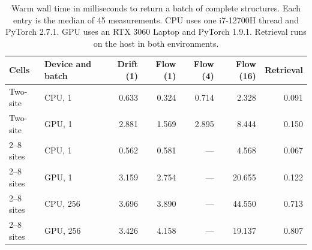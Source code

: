 \begin{table}[!htbp]
\centering\small
\caption{Warm wall time in milliseconds to return a batch of complete structures. Each entry is the median of 45 measurements. CPU uses one i7-12700H thread and PyTorch 2.7.1. GPU uses an RTX 3060 Laptop and PyTorch 1.9.1. Retrieval runs on the host in both environments.}
\label{tab:speed}
\begin{tabular}{llrrrrr}
\hline
Cells & Device and batch & Drift (1) & Flow (1) & Flow (4) & Flow (16) & Retrieval\\
\hline
Two-site & CPU, 1 & 0.633 & 0.324 & 0.714 & 2.328 & 0.091\\
Two-site & GPU, 1 & 2.881 & 1.569 & 2.895 & 8.444 & 0.150\\
2--8 sites & CPU, 1 & 0.562 & 0.581 & --- & 4.568 & 0.067\\
2--8 sites & GPU, 1 & 3.159 & 2.754 & --- & 20.655 & 0.122\\
2--8 sites & CPU, 256 & 3.696 & 3.890 & --- & 44.550 & 0.713\\
2--8 sites & GPU, 256 & 3.426 & 4.158 & --- & 19.137 & 0.807\\
\hline
\end{tabular}
\end{table}
